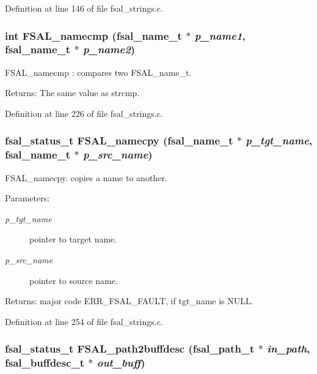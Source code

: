 Definition at line 146 of file fsal\_\-strings.c.
\subsubsection{\setlength{\rightskip}{0pt plus 5cm}int FSAL\_\-namecmp (fsal\_\-name\_\-t $\ast$ {\em p\_\-name1}, fsal\_\-name\_\-t $\ast$ {\em p\_\-name2})}\label{group__FSALNameFunctions_ga4}


FSAL\_\-namecmp : compares two FSAL\_\-name\_\-t.

\begin{Desc}
\item[Returns:]The same value as strcmp. \end{Desc}


Definition at line 226 of file fsal\_\-strings.c.
\subsubsection{\setlength{\rightskip}{0pt plus 5cm}fsal\_\-status\_\-t FSAL\_\-namecpy (fsal\_\-name\_\-t $\ast$ {\em p\_\-tgt\_\-name}, fsal\_\-name\_\-t $\ast$ {\em p\_\-src\_\-name})}\label{group__FSALNameFunctions_ga6}


FSAL\_\-namecpy. copies a name to another.

\begin{Desc}
\item[Parameters:]
\begin{description}
\item[{\em p\_\-tgt\_\-name}]pointer to target name. \item[{\em p\_\-src\_\-name}]pointer to source name. \end{description}
\end{Desc}
\begin{Desc}
\item[Returns:]major code ERR\_\-FSAL\_\-FAULT, if tgt\_\-name is NULL. \end{Desc}


Definition at line 254 of file fsal\_\-strings.c.
\subsubsection{\setlength{\rightskip}{0pt plus 5cm}fsal\_\-status\_\-t FSAL\_\-path2buffdesc (fsal\_\-path\_\-t $\ast$ {\em in\_\-path}, fsal\_\-buffdesc\_\-t $\ast$ {\em out\_\-buff})}\label{group__FSALNameFunctions_ga10}


